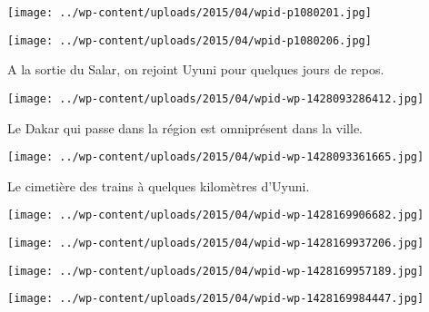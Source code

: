  

\begin{center} \texttt{[image: ../wp-content/uploads/2015/04/wpid-p1080201.jpg]} \end{center}



 

\begin{center} \texttt{[image: ../wp-content/uploads/2015/04/wpid-p1080206.jpg]} \end{center}



 A la sortie du Salar, on rejoint Uyuni pour quelques jours de repos. 

 

\begin{center} \texttt{[image: ../wp-content/uploads/2015/04/wpid-wp-1428093286412.jpg]} \end{center}



 Le Dakar qui passe dans la région est omniprésent dans la ville. 

 

\begin{center} \texttt{[image: ../wp-content/uploads/2015/04/wpid-wp-1428093361665.jpg]} \end{center}



 Le cimetière des trains à quelques kilomètres d'Uyuni. 

 

\begin{center} \texttt{[image: ../wp-content/uploads/2015/04/wpid-wp-1428169906682.jpg]} \end{center}



 

\begin{center} \texttt{[image: ../wp-content/uploads/2015/04/wpid-wp-1428169937206.jpg]} \end{center}



 

\begin{center} \texttt{[image: ../wp-content/uploads/2015/04/wpid-wp-1428169957189.jpg]} \end{center}



 

\begin{center} \texttt{[image: ../wp-content/uploads/2015/04/wpid-wp-1428169984447.jpg]} \end{center}




 
 
